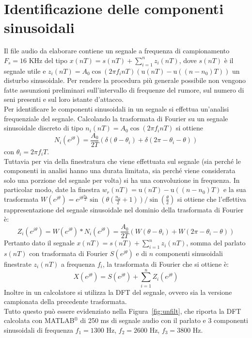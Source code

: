 \documentclass[10pt,A4]{article}
\begin{document}
\section{Identificazione delle componenti sinusoidali}
Il file audio da elaborare contiene un segnale a frequenza di campionamento $F_s = 16$ KHz del tipo $x(nT) = s(nT) + \sum_{i=1}^{n} z_i(nT)$, dove $s(nT)$ è il segnale utile e $z_i(nT) = A_0 \cos(2 \pi f_i n T)(\mathrm{u}(nT) - \mathrm{u}((n - n_0)T))$ un disturbo sinusoidale. Per rendere la procedura più generale possibile non vengono fatte assunzioni preliminari sull'intervallo di frequenze del rumore, sul numero di seni presenti e sul loro istante d'attacco. \\
Per identificare le componenti sinusoidali in un segnale si effettua un'analisi frequenziale del segnale.
Calcolando la trasformata di Fourier su un segnale sinusoidale discreto di tipo $n_i(nT) = A_0 \cos(2 \pi f_i n T)$ si ottiene
\begin{equation}
  N_i(e^{j\theta}) = \frac{A_0}{2T}(\delta(\theta - \theta_i) + \delta(2 \pi - \theta_i - \theta))
\end{equation}
con $\theta_i = 2\pi f_i T$. \\
Tuttavia per via della finestratura che viene effettuata sul segnale (sia perché le componenti in analisi hanno una durata limitata, sia perché viene considerata solo una porzione del segnale per volta) si ha una convoluzione in frequenza. In particolar modo, date la finestra $w_r(nT) =  \mathrm{u}(nT) - \mathrm{u}((n - n_0)T)$ e la sua trasformata $W(e^{j\theta}) = e^{j\theta \frac{n_0}{2}} \sin(\theta (\frac{n_0}{2} + 1)) / \sin(\frac{\theta} { 2}) $ si ottiene che l'effettiva rappresentazione del segnale sinusoidale nel dominio della trasformata di Fourier è:
\begin{equation}
  Z_i(e^{j\theta}) = W(e^{j\theta}) * N_i(e^{j\theta}) = \frac{A_0}{2T}(W(\theta - \theta_i) + W(2 \pi - \theta_i - \theta))
\end{equation}
Pertanto dato il segnale $x(nT) = s(nT) + \sum_{i=1}^{n} z_i(nT)$, somma del parlato $s(nT)$ con trasformata di Fourier $S(e^{j\theta})$ e di $n$ componenti sinusoidali finestrate $z_i(nT)$ a frequenza $f_i$, la trasformata di Fourier che si ottiene è:
\begin{equation}
  X(e^{j\theta}) = S(e^{j\theta}) + \sum_{i=1}^{n} Z_i(e^{j\theta})
\end{equation}
Inoltre in un calcolatore si utilizza la DFT del segnale, ovvero sia la versione campionata della precedente trasformata. \\
Tutto questo può essere evidenziato nella Figura~\ref{fig:unfilt}, che riporta la DFT calcolata con MATLAB$^{\circledR}$ di 250 ms di segnale audio con il parlato e 3 componenti sinusoidali di frequenza $f_1 = 1300$ Hz, $f_2 = 2600$ Hz, $f_3 = 3800$ Hz. \\
\end{document}
